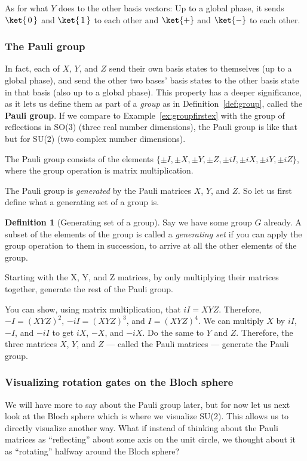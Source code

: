 \documentclass{article}
\theoremstyle{definition}
\newtheorem{definition}{Definition}
\newcommand{\kz}[1]{\ket{\,#1\,}}
\newcommand{\kx}[1]{\ket{#1}}
\begin{document}
As for what $Y$ does to the other basis vectors: Up to a global phase, it sends $\kz0$ and $\kz1$ to each other and $\kx+$ and $\kx-$ to each other.

\subsubsection{The Pauli group}
In fact, each of $X$, $Y$, and $Z$ send their own basis states to themselves (up to a global phase), and send the other two bases' basis states to the other basis state in that basis (also up to a global phase).
This property has a deeper significance, as it lets us define them as part of a \textit{group} as in Definition~\ref{def:group}, called the \textbf{Pauli group}.
If we compare to Example~\ref{ex:groupfirstex} with the group of reflections in SO(3) (three real number dimensions), the Pauli group is like that but for SU(2) (two complex number dimensions).

The Pauli group consists of the elements $\{\pm I, \pm X, \pm Y, \pm Z, \pm iI, \pm iX, \pm iY, \pm iZ\}$, where the group operation is matrix multiplication.

The Pauli group is \textit{generated} by the Pauli matrices $X$, $Y$, and $Z$.  So let us first define what a generating set of a group is.
\begin{definition}[Generating set of a group]
	\label{def:generategroup}
	Say we have some group $G$ already.
	A subset of the elements of the group is called a \textit{generating set} if you can apply the group operation to them in succession, to arrive at all the other elements of the group.
\end{definition}

\begin{example}
	\label{ex:generatepauli}
	Starting with the X, Y, and Z matrices, by only multiplying their matrices together, generate the rest of the Pauli group.

	\textnormal{
	You can show, using matrix multiplication, that $iI = X Y Z$.
	Therefore, $-I = (X Y Z)^2$, $-iI = (X Y Z)^3$, and $I = (X Y Z)^4$.
	We can multiply $X$ by $iI$, $-I$, and $-iI$ to get $iX$, $-X$, and $-iX$.
	Do the same to $Y$ and $Z$.
	Therefore, the three matrices $X$, $Y$, and $Z$ --- called the Pauli matrices --- generate the Pauli group.
	}
\end{example}

\subsubsection{Visualizing rotation gates on the Bloch sphere}
We will have more to say about the Pauli group later, but for now let us next look at the Bloch sphere which is where we visualize SU(2).
This allows us to directly visualize another way.  What if instead of thinking about the Pauli matrices as ``reflecting'' about some axis on the unit circle, we thought about it as ``rotating'' halfway around the Bloch sphere?
\end{document}
